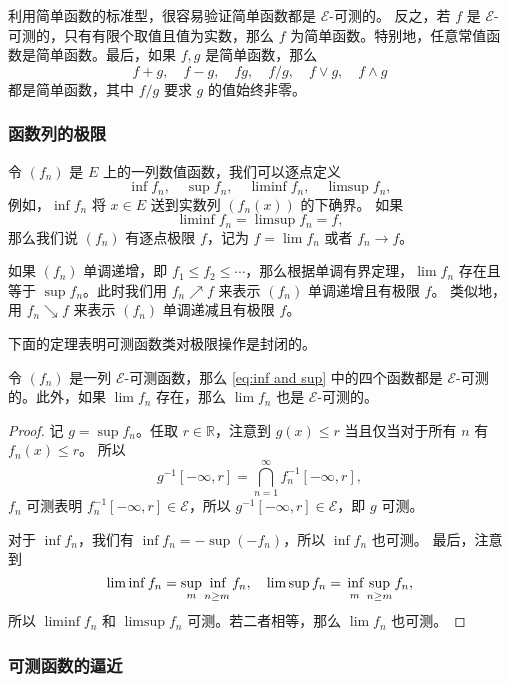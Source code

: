 \documentclass[fontset=none]{Notes}
\begin{document}
利用简单函数的标准型，很容易验证简单函数都是 $\mathcal{E}$-可测的。
反之，若 $f$ 是 $\mathcal{E}$-可测的，只有有限个取值且值为实数，那么
$f$ 为简单函数。特别地，任意常值函数是简单函数。最后，如果 $f,g$
是简单函数，那么
\[
  f+g,\quad f-g,\quad fg,\quad f/g,\quad f\vee g,\quad f\wedge g  
\]
都是简单函数，其中 $f/g$ 要求 $g$ 的值始终非零。

\subsubsection{函数列的极限}

令 $(f_n)$ 是 $E$ 上的一列数值函数，我们可以逐点定义
\begin{equation}\label{eq:inf and sup}
  \inf f_n,\quad \sup f_n,\quad \liminf f_n,\quad \limsup f_n,
\end{equation}
例如，$\inf f_n$ 将 $x\in E$ 送到实数列 $(f_n(x))$ 的下确界。
如果
\[
  \liminf f_n=\limsup f_n=f,
\]
那么我们说 $(f_n)$ 有逐点极限 $f$，记为 $f=\lim f_n$ 或者 $f_n\to f$。

如果 $(f_n)$ 单调递增，即 $f_1\leq f_2\leq \cdots$，那么根据单调有界定理，$\lim f_n$
存在且等于 $\sup f_n$。此时我们用 $f_n\nearrow f$ 来表示 $(f_n)$ 单调递增且有极限 $f$。
类似地，用 $f_n\searrow f$ 来表示 $(f_n)$ 单调递减且有极限 $f$。

下面的定理表明可测函数类对极限操作是封闭的。
\begin{theorem}\label{thm:lim of measurable function is measurable}
  令 $(f_n)$ 是一列 $\mathcal{E}$-可测函数，那么 \eqref{eq:inf and sup} 中的四个函数都是
  $\mathcal{E}$-可测的。此外，如果 $\lim f_n$ 存在，那么 $\lim f_n$ 也是 $\mathcal{E}$-可测的。
\end{theorem}
\begin{proof}
  记 $g=\sup f_n$。任取 $r\in \mathbb{R}$，注意到 $g(x)\leq r$ 当且仅当对于所有 $n$ 有 $f_n(x)\leq r$。
  所以
  \[
    g^{-1}[-\infty,r]=\bigcap_{n=1}^\infty f_n^{-1}[-\infty,r],
  \]
  $f_n$ 可测表明 $f_n^{-1}[-\infty,r]\in \mathcal{E}$，所以 $g^{-1}[-\infty,r]\in \mathcal{E}$，即
  $g$ 可测。

  对于 $\inf f_n$，我们有 $\inf f_n=-\sup (-f_n)$，所以 $\inf f_n$ 也可测。
  最后，注意到
  \[
    \liminf f_n=\sup\limits_m \mathop{\vphantom{\sup}\inf}_{n\geq m} f_n,\quad
    \limsup f_n=\mathop{\vphantom{\sup}\inf}_{m}\sup_{n\geq m} f_n,
  \] 
  所以 $\liminf f_n$ 和 $\limsup f_n$ 可测。若二者相等，那么 $\lim f_n$ 也可测。
\end{proof}

\subsubsection{可测函数的逼近}
\end{document}

